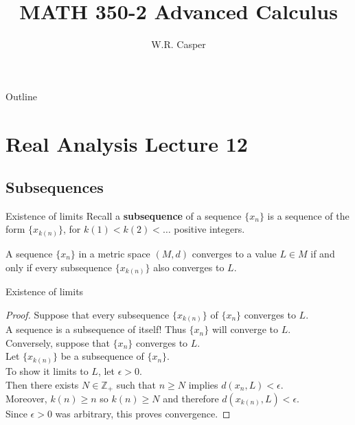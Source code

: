 \documentclass{beamer}
\title{MATH 350-2 Advanced Calculus}
\subtitle
{} %
\author[W.R. Casper] %
{W.R. Casper}
\institute[California State University Fullerton] %
{
  Department of Mathematics\\
  California State University Fullerton}
\begin{document}
\begin{frame}
  \titlepage
\end{frame}

\begin{frame}{Outline}
  \tableofcontents
\end{frame}



\section{Real Analysis Lecture 12}

\subsection{Subsequences}

\begin{frame}{Existence of limits}
Recall a \textbf{subsequence} of a sequence $\{x_n\}$ is a sequence of the form $\{x_{k(n)}\}$, for $k(1) < k(2) < \dots$ positive integers.
\pause
\begin{thm}
A sequence $\{x_n\}$ in a metric space $(M,d)$ converges to a value $L\in M$ if and only if every subsequence $\{x_{k(n)}\}$ also converges to $L$.
\end{thm}
\end{frame}

\begin{frame}{Existence of limits}
\begin{proof}
Suppose that every subsequence $\{x_{k(n)}\}$ of $\{x_n\}$ converges to $L$.\\
\pause
A sequence is a subsequence of itself!  Thus $\{x_n\}$ will converge to $L$.\\
\pause
Conversely, suppose that $\{x_n\}$ converges to $L$.\\
\pause
Let $\{x_{k(n)}\}$ be a subsequence of $\{x_n\}$.\\
\pause
To show it limits to $L$, let $\epsilon > 0$.\\
\pause
Then there exists $N\in\mathbb{Z}_+$ such that $n\geq N$ implies $d(x_n,L)<\epsilon$.\\
\pause
Moreover, $k(n)\geq n$ so $k(n)\geq N$ and therefore $d(x_{k(n)}, L) < \epsilon$.\\
\pause
Since $\epsilon > 0$ was arbitrary, this proves convergence.
\end{proof}
\end{frame}
\end{document}
